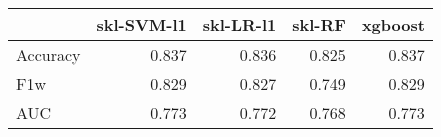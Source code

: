 \begin{tabular}{lrrrr}
\toprule
{} &  skl-SVM-l1 &  skl-LR-l1 &  skl-RF &  xgboost \\
\midrule
Accuracy &       0.837 &      0.836 &   0.825 &    0.837 \\
F1w      &       0.829 &      0.827 &   0.749 &    0.829 \\
AUC      &       0.773 &      0.772 &   0.768 &    0.773 \\
\bottomrule
\end{tabular}
